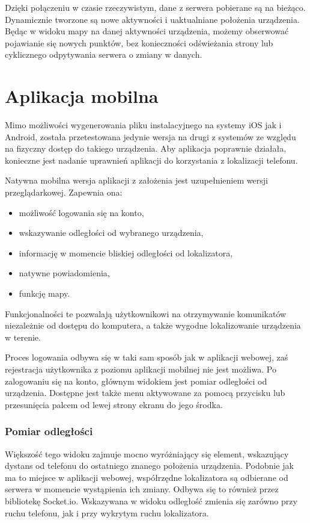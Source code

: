 \documentclass[eng,printmode]{mgr}
\begin{document}
Dzięki połączeniu w czasie rzeczywistym, dane z serwera pobierane są na bieżąco. Dynamicznie tworzone są nowe aktywności i uaktualniane położenia urządzenia. Będąc w widoku mapy na danej aktywności urządzenia, możemy obserwować pojawianie się nowych punktów, bez konieczności odświeżania strony lub cyklicznego odpytywania serwera o zmiany w danych.


\section{Aplikacja mobilna}
Mimo możliwości wygenerowania pliku instalacyjnego na systemy iOS jak i Android, została przetestowana jedynie wersja na drugi z systemów ze względu na fizyczny dostęp do takiego urządzenia. Aby aplikacja poprawnie działała, konieczne jest nadanie uprawnień aplikacji do korzystania z lokalizacji telefonu.

Natywna mobilna wersja aplikacji z założenia jest uzupełnieniem wersji przeglądarkowej. Zapewnia ona:
\begin{itemize}
\item możliwość logowania się na konto,
\item wskazywanie odległości od wybranego urządzenia,
\item informację w momencie bliskiej odległości od lokalizatora,
\item natywne powiadomienia,
\item funkcję mapy.
\end{itemize}
Funkcjonalności te pozwalają użytkownikowi na otrzymywanie komunikatów niezależnie od dostępu do komputera, a także wygodne lokalizowanie urządzenia w terenie.

Proces logowania odbywa się w taki sam sposób jak w aplikacji webowej, zaś rejestracja użytkownika z poziomu aplikacji mobilnej nie jest możliwa. Po zalogowaniu się na konto, głównym widokiem jest pomiar odległości od urządzenia. Dostępne jest także menu aktywowane za pomocą przycisku lub przesunięcia palcem od lewej strony ekranu do jego środka.

\subsubsection{Pomiar odległości}
Większość tego widoku zajmuje mocno wyróżniający się element, wskazujący dystans od telefonu do ostatniego znanego położenia urządzenia. Podobnie jak ma to miejsce w aplikacji webowej, współrzędne lokalizatora są odbierane od serwera w momencie wystąpienia ich zmiany. Odbywa się to również przez bibliotekę Socket.io. Wskazywana w widoku odległość zmienia się zarówno przy ruchu telefonu, jak i przy wykrytym ruchu lokalizatora. 
\end{document}
